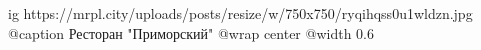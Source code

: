  
 
 
 
 

\ifcmt
  ig https://mrpl.city/uploads/posts/resize/w/750x750/ryqihqss0u1wldzn.jpg
	@caption Ресторан "Приморский"
  @wrap center
  @width 0.6
\fi
